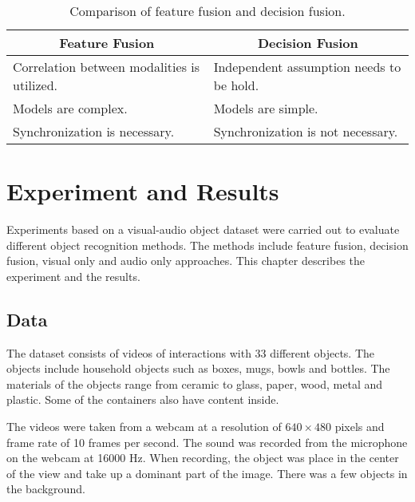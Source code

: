 \documentclass[12pt,final,twoside]{report}
\begin{document}
\begin{table}[t]
  \caption{Comparison of feature fusion and decision fusion.}
  \label{tab:fusion}
  \centering
  \begin{tabular}{p{}p{}}
    \toprule
    \multicolumn{1}{c}{\bfseries Feature Fusion} & \multicolumn{1}{c}{\bfseries Decision Fusion} \\ \midrule
    Correlation between modalities is utilized. & Independent assumption needs to be hold. \\
    Models are complex. & Models are simple. \\
    Synchronization is necessary. & Synchronization is not necessary. \\ 
    \bottomrule
  \end{tabular}
\end{table}

\cleardoublepage
\chapter{Experiment and Results}
\label{ch:experiment}
Experiments based on a visual-audio object dataset were carried out to evaluate different object recognition methods. The methods include feature fusion, decision fusion, visual only and audio only approaches. This chapter describes the experiment and the results.

\section{Data}
The dataset consists of videos of interactions with 33 different objects. The objects include household objects such as boxes, mugs, bowls and bottles. The materials of the objects range from ceramic to glass, paper, wood, metal and plastic. Some of the containers also have content inside.

The videos were taken from a webcam at a resolution of $640 \times 480$ pixels and frame rate of 10 frames per second. The sound was recorded from the microphone on the webcam at 16000 Hz. When recording, the object was place in the center of the view and take up a dominant part of the image. There was a few objects in the background.
\end{document}
